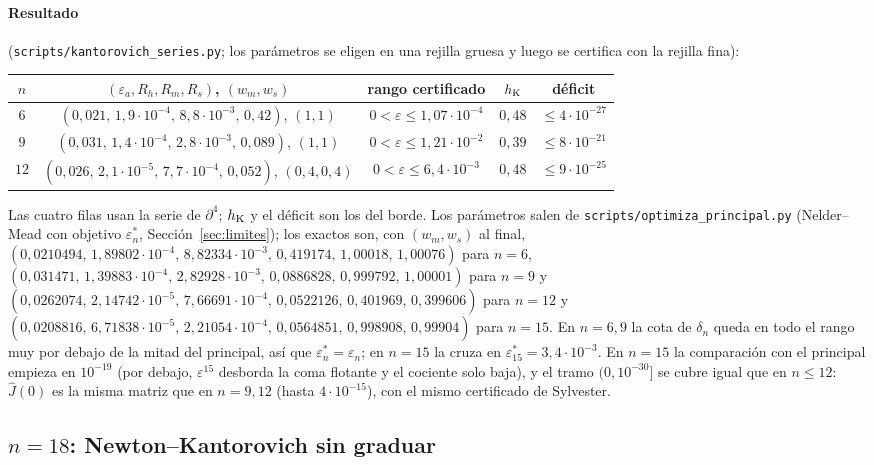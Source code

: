 \documentclass[11pt,a4paper]{article}
\theoremstyle{definition}
\theoremstyle{remark}
\newcommand{\eps}{\varepsilon}
\newcommand{\scr}[1]{\texttt{scripts/#1}}
\begin{document}
\paragraph{Resultado} (\scr{kantorovich\_series.py}; los parámetros se eligen en una rejilla gruesa y
luego se certifica con la rejilla fina):

\begin{center}
\begin{tabular}{@{}ccccc@{}}
\toprule
$n$ & $(\eps_a,R_h,R_m,R_s)$, $(w_m,w_s)$ & rango certificado & $h_{\rm K}$ & déficit\\
\midrule
$6$ & $(0{,}021,\,1{,}9\cdot10^{-4},\,8{,}8\cdot10^{-3},\,0{,}42)$, $(1,1)$ & $0<\eps\le1{,}07\cdot10^{-4}$ & $0{,}48$ & $\le4\cdot10^{-27}$\\
$9$ & $(0{,}031,\,1{,}4\cdot10^{-4},\,2{,}8\cdot10^{-3},\,0{,}089)$, $(1,1)$ & $0<\eps\le1{,}21\cdot10^{-2}$ & $0{,}39$ & $\le8\cdot10^{-21}$\\
$12$ & $(0{,}026,\,2{,}1\cdot10^{-5},\,7{,}7\cdot10^{-4},\,0{,}052)$, $(0{,}4,0{,}4)$ & $0<\eps\le6{,}4\cdot10^{-3}$ & $0{,}48$ & $\le9\cdot10^{-25}$\\
\bottomrule
\end{tabular}
\end{center}
\noindent Las cuatro filas usan la serie de $\partial^4$; $h_{\rm K}$ y el déficit son los del borde. Los
parámetros salen de \scr{optimiza\_\allowbreak principal.py} (Nelder--Mead con objetivo $\eps_n^*$,
Sección~\ref{sec:limites}); los exactos son, con $(w_m,w_s)$ al final,
$(0{,}0210494,\,1{,}89802\cdot10^{-4},\,8{,}82334\cdot10^{-3},\,0{,}419174,\,1{,}00018,\,1{,}00076)$ para $n=6$,
$(0{,}031471,\,1{,}39883\cdot10^{-4},\,2{,}82928\cdot10^{-3},\,0{,}0886828,\,0{,}999792,\,1{,}00001)$ para $n=9$ y
$(0{,}0262074,\,2{,}14742\cdot10^{-5},\,7{,}66691\cdot10^{-4},\,0{,}0522126,\,0{,}401969,\,0{,}399606)$ para $n=12$ y
$(0{,}0208816,\,6{,}71838\cdot10^{-5},\,2{,}21054\cdot10^{-4},\,0{,}0564851,\,0{,}998908,\,0{,}99904)$ para $n=15$.
En $n=6,9$ la cota de $\delta_n$ queda en todo el rango muy por debajo de la mitad del principal, así que
$\eps_n^*=\eps_n$; en $n=15$ la cruza en $\eps_{15}^*=3{,}4\cdot10^{-3}$. En $n=15$ la comparación con el
principal empieza en $10^{-19}$ (por debajo, $\eps^{15}$ desborda la coma flotante y el cociente solo baja), y
el tramo $(0,10^{-30}]$ se cubre igual que en $n\le12$: $\hat J(0)$ es la misma matriz que en $n=9,12$ (hasta
$4\cdot10^{-15}$), con el mismo certificado de Sylvester.


\subsection{$n=18$: Newton--Kantorovich sin graduar}\label{sec:sin_graduar}
\end{document}
